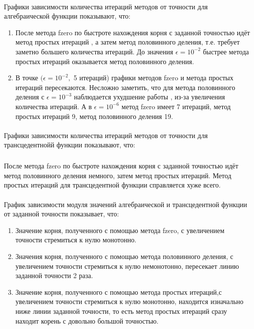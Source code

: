 \documentclass{article}
\begin{document}
	\paragraph{}Графики зависимости количества итераций методов от точности для алгебраической функции показывают, что:
	\begin{enumerate}
		\item После метода fzero по быстроте нахождения корня с заданной точностью идёт метод простых итераций , а затем метод половинного деления, т.е. требует заметно большего количества итераций. До значения $\epsilon=10^{-2}$ быстрее метода простых итераций оказывается метод половинного деления.  
		
		\item В точке $(\epsilon=10^{-2},$ 5 итераций) графики методов fzero и метода простых итераций пересекаются. Несложно заметить, что для метода половинного деления с $\epsilon=10^{-3}$ наблюдается ухудшение работы , из-за увеличения количества итераций. А в $\epsilon=10^{-6}$ метод fzero имеет 7 итераций, метод простых итераций 9, метод половинного деления 19.
	\end{enumerate}
	\paragraph{}Графики зависимости количества итераций методов от точности для трансцедентнойй функции показывают, что:
 \subparagraph{}
 После метода fzero по быстроте нахождения корня с заданной точностью идёт метод половинного деления немного, затем метод простых итераций. Метод простых итераций для трансцедентной функции справляется хуже всего.


	\paragraph{}График зависимости модуля значений  алгебраической и трансцедентной функции от заданной точности показывает, что:
	\begin{enumerate}
		\item Значение корня, полученного с помощью метода fzero, с увеличением точности стремиться к нулю монотонно.  
		\item Значения корня, полученного с помощью метода половинного деления, с увеличением точности стремиться к нулю немонотонно, пересекает линию заданной точности 2 раза.
		\item Значение корня, полученного с помощью метода простых итераций,с увеличением точности стремиться к нулю монотонно, находится изначально ниже линии заданной точности, то есть метод простых итераций сразу находит корень с довольно большой точностью.
	\end{enumerate}
\end{document}
